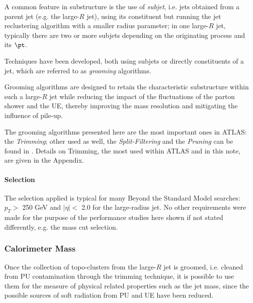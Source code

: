 A common feature in substructure is the use of \textit{subjet}, i.e. jets obtained from a parent jet (e.g. the large-$R$ jet), using its constituent but running the jet reclustering algorithm with a smaller radius parameter; in one large-$R$ jet, typically there are two or more subjets depending on the originating process and its $\pt$.

Techniques have been developed, both using subjets or directly constituents of a jet, which are referred to as \textit{grooming} algorithms.

Grooming algorithms are designed to retain the characteristic substructure within such a large-$R$
jet while reducing the impact of the fluctuations of the parton shower and the UE, thereby
improving the mass resolution and mitigating the influence of pile-up.

The grooming algorithms presented here are the most important ones in ATLAS: the \textit{Trimming}; other used as well, the \textit{Split-Filtering} and the \textit{Pruning} can be found in \cite{substructure1}. Details on Trimming, the most used within ATLAS and in this note, are given in the Appendix.

\paragraph{Selection}

The selection applied is typical for many Beyond the Standard Model searches: $p_T>$ 250 GeV and $|\eta|<$ 2.0 for the large-radius jet.
No other requirements were made for the purpose of the performance studies here shown if not stated differently, e.g. the mass cut selection.


\subsubsection{Calorimeter Mass}

Once the collection of topo-clusters from the large-$R$ jet is groomed, i.e. cleaned from PU contamination through the trimming technique, it is possible to use them for the measure of physical related properties such as the jet mass, since the possible sources of soft radiation from PU and UE have been reduced.


